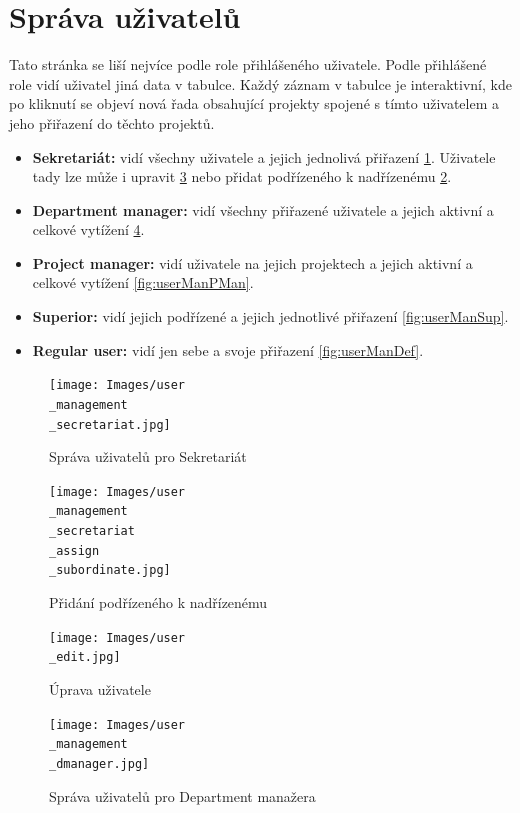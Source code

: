 \documentclass[czech,P5]{thesiskiv}
\begin{document}
\section{Správa uživatelů}
Tato stránka se liší nejvíce podle role přihlášeného uživatele. Podle přihlášené role vidí uživatel jiná data v tabulce. Každý záznam v tabulce je interaktivní, kde po kliknutí se objeví nová řada obsahující projekty spojené s tímto uživatelem a jeho přiřazení do těchto projektů.
\begin{itemize}
             \item \textbf{Sekretariát:} vidí všechny uživatele a jejich jednolivá přiřazení \ref{fig:userManSec}. Uživatele tady lze může i upravit \ref{fig:userEdit} nebo přidat podřízeného k nadřízenému \ref{fig:userManAddSub}.
             \item \textbf{Department manager:} vidí všechny přiřazené uživatele a jejich aktivní a celkové vytížení \ref{fig:userManDMan}.
             \item \textbf{Project manager:} vidí uživatele na jejich projektech a jejich aktivní a celkové vytížení \ref{fig:userManPMan}.
             \item \textbf{Superior:} vidí jejich podřízené a jejich jednotlivé přiřazení \ref{fig:userManSup}.
             \item \textbf{Regular user:} vidí jen sebe a svoje přiřazení \ref{fig:userManDef}.
\end{itemize}
 \begin{figure}[H]
	\centering
	\texttt{[image: Images/user\\\_management\\\_secretariat.jpg]}
	\caption{Správa uživatelů pro Sekretariát}
	\label{fig:userManSec} 
\end{figure}
 \begin{figure}[H]
	\centering
	\texttt{[image: Images/user\\\_management\\\_secretariat\\\_assign\\\_subordinate.jpg]}
	\caption{Přidání podřízeného k nadřízenému}
	\label{fig:userManAddSub} 
\end{figure}
 \begin{figure}[H]
	\centering
	\texttt{[image: Images/user\\\_edit.jpg]}
	\caption{Úprava uživatele}
	\label{fig:userEdit} 
\end{figure}
 \begin{figure}[H]
	\centering
	\texttt{[image: Images/user\\\_management\\\_dmanager.jpg]}
	\caption{Správa uživatelů pro Department manažera}
	\label{fig:userManDMan} 
\end{figure}
\end{document}
